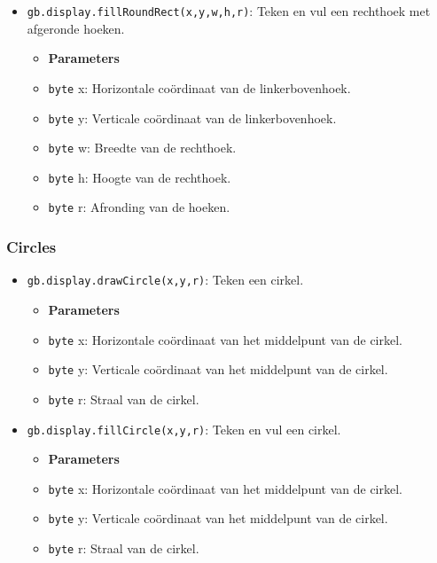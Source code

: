 \documentclass[a4paper,titlepage,12pt]{article}
\begin{document}
\begin{itemize}
		\item \texttt{gb.display.fillRoundRect(x,y,w,h,r)}: Teken en vul een rechthoek met afgeronde hoeken.
		\begin{itemize}
			\item [] \textbf{Parameters}
			\item \texttt{byte} x: Horizontale coördinaat van de linkerbovenhoek.
			\item \texttt{byte} y: Verticale coördinaat van de linkerbovenhoek.
			\item \texttt{byte} w: Breedte van de rechthoek.
			\item \texttt{byte} h: Hoogte van de rechthoek.
			\item \texttt{byte} r: Afronding van de hoeken.
		\end{itemize}
	\end{itemize}

	\subsubsection{Circles}
	\begin{itemize}
		\item \texttt{gb.display.drawCircle(x,y,r)}: Teken een cirkel.
		\begin{itemize}
			\item [] \textbf{Parameters}
			\item \texttt{byte} x: Horizontale coördinaat van het middelpunt van de cirkel.
			\item \texttt{byte} y: Verticale coördinaat van het middelpunt van de cirkel.
			\item \texttt{byte} r: Straal van de cirkel.
		\end{itemize}
	
		\item \texttt{gb.display.fillCircle(x,y,r)}: Teken en vul een cirkel.
		\begin{itemize}
			\item [] \textbf{Parameters}
			\item \texttt{byte} x: Horizontale coördinaat van het middelpunt van de cirkel.
			\item \texttt{byte} y: Verticale coördinaat van het middelpunt van de cirkel.
			\item \texttt{byte} r: Straal van de cirkel.
		\end{itemize}
	\end{itemize}
\end{document}
